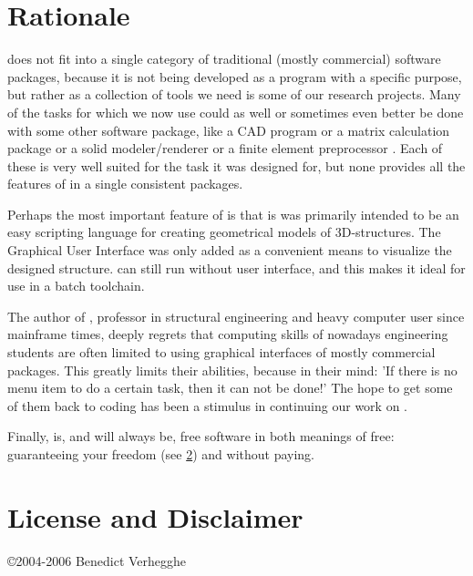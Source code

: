 \section{Rationale}
\label{sec:rationale}
\pyformex does not fit into a single category of traditional (mostly commercial) software packages, because it is not being developed as a program with a specific purpose, but rather as a collection of tools we need is some of our research projects. Many of the tasks for which we now use \pyformex could as well or sometimes even better be done with some other software package, like a CAD program %
or a %
matrix calculation package or a solid modeler/renderer %
or a finite element preprocessor%
. Each of these is very well suited for the task it was designed for, but none provides all the features of \pyformex in a single consistent packages. 

Perhaps the most important feature of \pyformex is that is was primarily intended to be an easy scripting language for creating geometrical models of 3D-structures. The Graphical User Interface was only added as a convenient means to visualize the designed structure. \pyformex can still run without user interface, and this makes it ideal for use in a batch toolchain.

The author of \pyformex, professor in structural engineering and heavy computer user since mainframe times, deeply regrets that computing skills of nowadays engineering students are often limited to using graphical interfaces of mostly commercial packages. This greatly limits their abilities, because in their mind: 'If there is no menu item to do a certain task, then it can not be done!'
The hope to get some of them back to coding has been a stimulus in continuing our work on \pyformex. 
 
Finally, \pyformex is, and will always be, free software in both meanings of free: guaranteeing your freedom (see \ref{sec:license}) and without paying. 



\section{License and Disclaimer}
\label{sec:license}
\pyformex \copyright 2004-2006 Benedict Verhegghe

